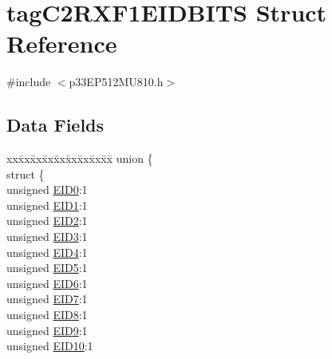 \hypertarget{structtag_c2_r_x_f1_e_i_d_b_i_t_s}{}\section{tag\+C2\+R\+X\+F1\+E\+I\+D\+B\+I\+TS Struct Reference}
\label{structtag_c2_r_x_f1_e_i_d_b_i_t_s}


{\ttfamily \#include $<$p33\+E\+P512\+M\+U810.\+h$>$}

\subsection*{Data Fields}
\begin{DoxyCompactItemize}
\item 
\begin{tabbing}
xx\=xx\=xx\=xx\=xx\=xx\=xx\=xx\=xx\=\kill
union \{\\
\>struct \{\\
\>\>unsigned \hyperlink{structtag_c2_r_x_f1_e_i_d_b_i_t_s_a9da8b7b30247e4f9cd8cc056549aa9fd}{EID0}:1\\
\>\>unsigned \hyperlink{structtag_c2_r_x_f1_e_i_d_b_i_t_s_afd6c139491d147c1262f3d051c6691e9}{EID1}:1\\
\>\>unsigned \hyperlink{structtag_c2_r_x_f1_e_i_d_b_i_t_s_a36ec62d8d3c5acd5d15e6691dc099a94}{EID2}:1\\
\>\>unsigned \hyperlink{structtag_c2_r_x_f1_e_i_d_b_i_t_s_ab895f7d0ac289a0383b607cbc62eebe2}{EID3}:1\\
\>\>unsigned \hyperlink{structtag_c2_r_x_f1_e_i_d_b_i_t_s_a136d5a709d6618d40acceccb43036656}{EID4}:1\\
\>\>unsigned \hyperlink{structtag_c2_r_x_f1_e_i_d_b_i_t_s_a8dffb2d86a6c184df505ae7c71a58710}{EID5}:1\\
\>\>unsigned \hyperlink{structtag_c2_r_x_f1_e_i_d_b_i_t_s_af8a8574102515d8f1a4b7fd1685d0532}{EID6}:1\\
\>\>unsigned \hyperlink{structtag_c2_r_x_f1_e_i_d_b_i_t_s_a84c3262e67f8d5fd387ac10bde6fa9b1}{EID7}:1\\
\>\>unsigned \hyperlink{structtag_c2_r_x_f1_e_i_d_b_i_t_s_acca25e0b7d86eb499d01f85222baea87}{EID8}:1\\
\>\>unsigned \hyperlink{structtag_c2_r_x_f1_e_i_d_b_i_t_s_ac6748f73d4ada8538b06548be4f396c2}{EID9}:1\\
\>\>unsigned \hyperlink{structtag_c2_r_x_f1_e_i_d_b_i_t_s_a9cea8e77ecbb72bd3b08102412793725}{EID10}:1\\

\end{tabbing}
\end{DoxyCompactItemize}
